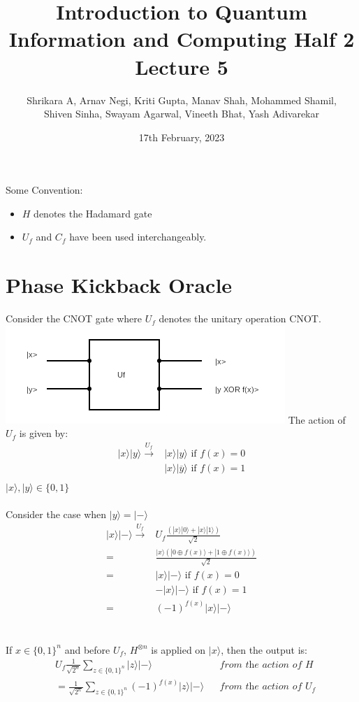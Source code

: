 \documentclass{article}
\title{Introduction to Quantum Information and Computing Half 2 Lecture 5}
\author{Shrikara A, Arnav Negi, Kriti Gupta, Manav Shah, Mohammed Shamil,\\ Shiven Sinha, Swayam Agarwal, Vineeth Bhat, Yash Adivarekar}
\date{17th February, 2023}
\begin{document}
    \maketitle
    \vfill
    Some Convention: 
    \begin{itemize}
        \item $H$ denotes the Hadamard gate
        \item $U_f$ and $C_f$ have been used interchangeably. 
    \end{itemize}
    \tableofcontents
    \newpage

    \section{Phase Kickback Oracle}
    Consider the CNOT gate where $U_f$ denotes the unitary operation CNOT.\\
    \includegraphics{images/CNOT.png}
    The action of $U_f$ is given by:  
    \begin{align*}
    |x\rangle|y\rangle \xrightarrow{U_f} &|x\rangle|y\rangle \text{ if }f(x)=0\\
    & |x\rangle|\overline{y}\rangle \text{ if }f(x)=1\\
    \end{align*}
    $|x\rangle,|y\rangle \in \{0,1\}$
\\
\\
    Consider the case when $|y\rangle=|-\rangle$
    \begin{align*}
    |x\rangle|-\rangle \xrightarrow{U_f} &U_f\frac{(|x\rangle|0\rangle+|x\rangle|1\rangle)}{\sqrt{2}}\\
    =&\frac{|x\rangle(|0 \oplus f(x)\rangle +|1 \oplus f(x)\rangle)}{\sqrt{2}}\\
    =&|x\rangle|-\rangle \text{ if } f(x)=0\\
    &-|x\rangle|-\rangle \text{ if } f(x)=1\\
    =&(-1)^{f(x)}|x\rangle|-\rangle
    \end{align*}
\\
\\
    If $x \in \{0, 1\}^n$ and before $U_f$, $H^{\otimes n}$ is applied on $|x\rangle$, then the output is:
    \begin{align*}
    &U_f \frac{1}{\sqrt{2^n}}\sum_{z \in \{0,1\}^n} |z\rangle|-\rangle && \textit{from the action of H}\\
    &=\frac{1}{\sqrt{2^n}}\sum_{z \in \{0,1\}^n} (-1)^{f(x)} |z\rangle |-\rangle && \textit{from the action of $U_f$}
    \end{align*}
\end{document}
